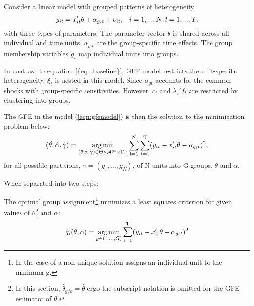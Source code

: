 Consider a linear model with grouped patterns of heterogeneity 
\begin{align}\label{eqn:gfemodel}
y_{it} = x_{it}'\theta + \alpha_{g_{i}t} + \upsilon_{it}, \hspace{0.3cm} i=1,...,N, t=1,...,T, \end{align}
with three types of parameters: 
The parameter vector $\theta$ is shared across all individual and time units. $\alpha_{g_it}$ are the group-specific time effects. The group membership variables $g_i$ map individual units into groups.

In contrast to equation \eqref{{eqn:baseline}}, GFE model restricts the unit-specific heterogeneity. $\xi_t$ is nested in this model. Since $\alpha_{gt}$ accounts for the common shocks with group-specific sensitivities. However, $c_i$ and $\lambda_i' f_t$ are restricted by clustering into groups.

The GFE in the model (\ref{eqn:gfemodel}) is then the solution to the minimization problem below:
\begin{align} \label{eqn:gfeestimator}
(\hat\theta, \hat\alpha, \hat\gamma) = \operatorname*{arg\,min}_{(\theta, \alpha, \gamma)\in \Theta \times \mathcal{A}^{gt} \times \Gamma_G} \operatorname*{\sum_{i=1}^N} \operatorname*{\sum_{t=1}^T} (y_{it} - x_{it}'\theta - \alpha_{g_{i}t})^2,
\end{align}
for all possible partitions, $\gamma = (g_1,\dots, g_N)$, of N units into G groups, $\theta$ and $\alpha$.

When separated into two steps:

The optimal group assignment\footnote{In the case of a non-unique solution \textcite{bonhomme2015grouped} assigns an individual unit to the minimum g.} minimizes a least squares criterion for given values of $\theta$\footnote{In this section, $\hat{\theta}_{gfe} = \hat{\theta}$ ergo the subscript notation is omitted for the GFE estimator of $\theta$.} and $\alpha$:
\begin{align}\label{eqn:groupassign}
\hat g_i(\theta, \alpha) = \operatorname*{arg\,min}_{g \in (1, \dots, G) } \operatorname*{\sum_{t=1}^T} (y_{it} - x_{it}'\theta - \alpha_{g_{i}t})^2
\end{align}

